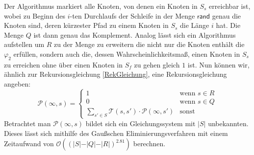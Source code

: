 \documentclass{lni}
\theoremstyle{def_style}
\theoremstyle{break}
\begin{document}
Der Algorithmus markiert alle Knoten, von denen ein Knoten in $S_s$ erreichbar ist, wobei zu Beginn des $i$-ten Durchlaufs der Schleife in der Menge $\mathsf{rand}$ genau die Knoten sind, deren kürzester Pfad zu einem Knoten in $S_s$ die Länge $i$ hat.
Die Menge $Q$ ist dann genau das Komplement.
Analog lässt sich ein Algorithmus aufstellen um $R$ zu der Menge zu erweitern die nicht nur die Knoten enthält die $\varphi_2$ erfüllen, sondern auch die, dessen Wahrscheinlichkeitsmaß, einen Knoten in $S_s$ zu erreichen ohne über einen Knoten in $S_f$ zu gehen gleich $1$ ist.
Nun können wir, ähnlich zur Rekursionsgleichung \ref{RekGleichung}, eine Rekursionsgleichung angeben:
\begin{equation}
	\mathcal{P}(\infty, s) = \begin{cases}
		1 & \text{wenn } s\in R \\
		0 & \text{wenn } s\in Q \\
		\sum_{s'\in S} \mathcal{T}(s,s')\cdot \mathcal{P}(\infty, s') & \text{sonst}
	\end{cases}
\end{equation}
Betrachtet man $\mathcal{P}(\infty, s)$ bildet sich ein Gleichungssystem mit $\vert S \vert$ unbekannten. Dieses lässt sich mithilfe des Gaußschen Eliminierungsverfahren mit einem Zeitaufwand von $\mathcal{O}((\vert S \vert - \vert Q \vert - \vert R \vert)^2.81)$ berechnen. \cite{hansson1994logic}
\end{document}
